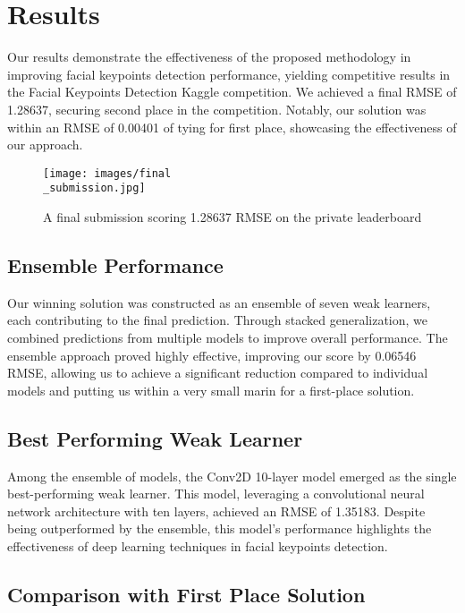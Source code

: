 \section{Results}
\label{sec:results}

Our results demonstrate the effectiveness of the proposed methodology in improving facial keypoints detection performance, yielding competitive results in the Facial Keypoints Detection Kaggle competition. We achieved a final RMSE of 1.28637, securing second place in the competition. Notably, our solution was within an RMSE of 0.00401 of tying for first place, showcasing the effectiveness of our approach.

\begin{figure}[hbt!]
	\centering
	\texttt{[image: images/final\\\_submission.jpg]}
	\caption{A final submission scoring 1.28637 RMSE on the private leaderboard}
	\label{fig:finalsubmission}
\end{figure}

\subsection{Ensemble Performance}

Our winning solution was constructed as an ensemble of seven weak learners, each contributing to the final prediction. Through stacked generalization, we combined predictions from multiple models to improve overall performance. The ensemble approach proved highly effective, improving our score by 0.06546 RMSE, allowing us to achieve a significant reduction compared to individual models and putting us within a very small marin for a first-place solution.

\subsection{Best Performing Weak Learner}

Among the ensemble of models, the Conv2D 10-layer model emerged as the single best-performing weak learner. This model, leveraging a convolutional neural network architecture with ten layers, achieved an RMSE of 1.35183. Despite being outperformed by the ensemble, this model's performance highlights the effectiveness of deep learning techniques in facial keypoints detection.

\subsection{Comparison with First Place Solution}

